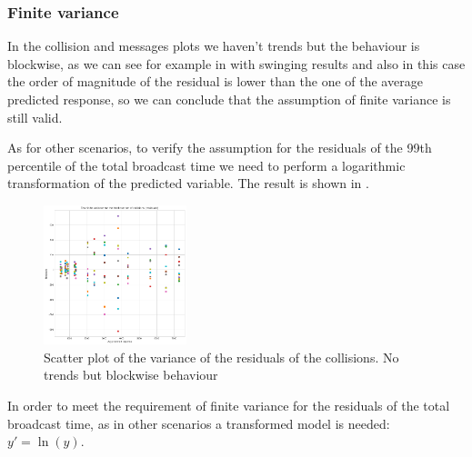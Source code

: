 \subsubsection{Finite variance}\label{rectassumptionsvariance}

In the collision and messages plots we haven't trends but the behaviour is
blockwise, as we can see for example in  with
swinging results and also in this case the order of magnitude of the residual is
lower than the one of the average predicted response, so we can conclude that
the assumption of finite variance is still valid.

As for other scenarios, to verify the assumption for the residuals of the 99th
percentile of the total broadcast time we need to perform a logarithmic
transformation of the predicted variable. The result is shown in
.

\begin{figure}[htb]
	\centering
	\includegraphics[width=0.37\textwidth]{img/rect/collisionvariance.png}
	\caption{Scatter plot of the variance of the residuals of the
	collisions. No trends but blockwise
	behaviour}\label{fig:recttimevariance}
\end{figure}

In order to meet the requirement of finite variance for the residuals of the
total broadcast time, as in other scenarios a transformed model is needed: \(y'
= \ln(y)\).
